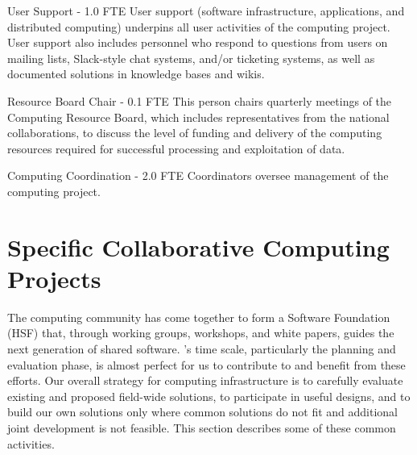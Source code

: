 \begin{description}
\item {User Support - 1.0 FTE}
User support (software infrastructure, applications, and distributed computing) underpins all user activities of the computing project. User support also includes personnel who respond to questions from users on mailing lists, Slack-style chat systems, and/or ticketing systems, as well as documented solutions in knowledge bases and wikis.%

\item {Resource Board Chair - 0.1 FTE}
This person chairs quarterly meetings of the Computing Resource Board, which includes representatives from the national  collaborations, to discuss the level of funding and delivery of the computing resources required for successful processing and exploitation of  data. %

\item {Computing Coordination - 2.0 FTE}
Coordinators oversee management of the computing project. %

\end{description}



\section{Specific Collaborative Computing Projects}
\label{ch:exec-comp-gov-coop}

The  computing community has come together to form a  Software Foundation (HSF)\cite{Alves:2017she} that, through working groups, workshops, and white papers, guides the next generation of shared  software.  's time scale, particularly the planning and evaluation phase, is almost perfect for us to contribute to and benefit from these efforts.  Our overall strategy for computing infrastructure is to carefully evaluate existing and proposed field-wide solutions, to participate in useful designs, and to build our own solutions only where common solutions do not fit and additional joint development is not feasible.   This section describes some of these common activities. 



